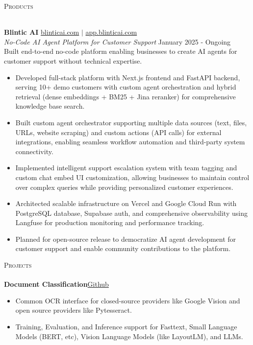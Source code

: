 \documentclass[a4paper]{article}
\newcommand{\lineunder} {
    \vspace*{-8pt} \\
    \hspace*{-18pt} \hrulefill \\
}
\newcommand{\header} [1] {
    {\hspace*{-18pt}\vspace*{6pt} \textsc{#1}}
    \vspace*{-6pt} \lineunder
}
\begin{document}
\header{Products}
\vspace{1mm}

\textbf{Blintic AI} \hfill \href{https://www.blinticai.com/}{blinticai.com} $|$ \href{https://app.blinticai.com}{app.blinticai.com}\\
\textit{No-Code AI Agent Platform for Customer Support} \hfill January 2025 - Ongoing\\

{Built end-to-end no-code platform enabling businesses to create AI agents for customer support without technical expertise.}
\begin{itemize} \itemsep 0pt
    \item Developed full-stack platform with Next.js frontend and FastAPI backend, serving 10+ demo customers with custom agent orchestration and hybrid retrieval (dense embeddings + BM25 + Jina reranker) for comprehensive knowledge base search.
    \item Built custom agent orchestrator supporting multiple data sources (text, files, URLs, website scraping) and custom actions (API calls) for external integrations, enabling seamless workflow automation and third-party system connectivity.
    \item Implemented intelligent support escalation system with team tagging and custom chat embed UI customization, allowing businesses to maintain control over complex queries while providing personalized customer experiences.
    \item Architected scalable infrastructure on Vercel and Google Cloud Run with PostgreSQL database, Supabase auth, and comprehensive observability using Langfuse for production monitoring and performance tracking.
    \item Planned for open-source release to democratize AI agent development for customer support and enable community contributions to the platform.
\end{itemize}


\header{Projects}
{\textbf{Document Classification}}\hfill \href{https://github.com/amit-timalsina/document-classification}{Github}
\vspace{-2mm}
\begin{itemize} \itemsep 0pt
    \item Common OCR interface for closed-source providers like Google Vision and open source providers like Pytesseract.
    \item Training, Evaluation, and Inference support for Fasttext, Small Language Models (BERT, etc), Vision Language Models (like LayoutLM), and LLMs.
\end{itemize}
\end{document}
